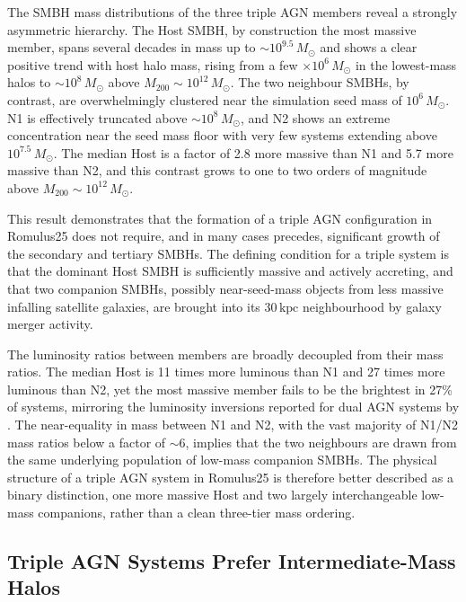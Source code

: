 \documentclass[twocolumn, 10pt]{article}
\begin{document}
The SMBH mass distributions of the three triple AGN members reveal a
strongly asymmetric hierarchy. The Host SMBH, by construction the
most massive member, spans several decades in mass up to
$\sim 10^{9.5}\,M_\odot$ and shows a clear positive trend with host
halo mass, rising from a few $\times 10^6\,M_\odot$ in the lowest-mass halos
to $\sim 10^8\,M_\odot$ above $M_{200} \sim 10^{12}\,M_\odot$. The
two neighbour SMBHs, by contrast, are overwhelmingly clustered near
the simulation seed mass of $10^6\,M_\odot$. N1 is effectively
truncated above $\sim 10^8\,M_\odot$, and N2 shows an extreme
concentration near the seed mass floor with very few systems
extending above $10^{7.5}\,M_\odot$. The median Host is a factor of 2.8 more massive than N1 and 5.7 more
massive than N2, and this contrast grows to one to two orders of
magnitude above $M_{200} \sim 10^{12}\,M_\odot$.

This result demonstrates that the formation of a triple AGN
configuration in Romulus25 does not require, and in many cases
precedes, significant growth of the secondary and tertiary SMBHs.
The defining condition for a triple system is that the dominant Host
SMBH is sufficiently massive and actively accreting, and that two
companion SMBHs, possibly near-seed-mass objects from less massive
infalling satellite galaxies, are brought into its $30\,\mathrm{kpc}$
neighbourhood by galaxy merger activity.

The luminosity ratios between members are broadly decoupled from
their mass ratios. The median Host is 11 times more luminous than N1 and 27 times more
luminous than N2, yet the most massive member fails to be the
brightest in 27\% of systems, mirroring the luminosity inversions
reported for dual AGN systems by \citet{Saeedzadeh2024}.
The near-equality in mass between N1 and N2, with the vast majority
of N1/N2 mass ratios below a factor of $\sim 6$, implies that the
two neighbours are drawn from the same underlying population of
low-mass companion SMBHs. The physical structure of a triple AGN
system in Romulus25 is therefore better described as a binary
distinction, one more massive Host and two largely interchangeable low-mass
companions, rather than a clean three-tier mass ordering.

\subsection*{Triple AGN Systems Prefer Intermediate-Mass Halos}
\end{document}
